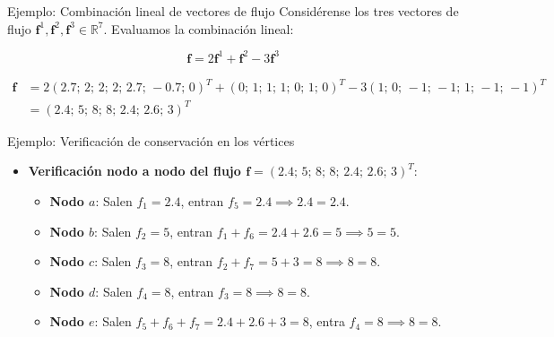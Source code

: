 \documentclass[
  ignorenonframetext,
]{beamer}
\providecommand{\tightlist}{%
  \setlength{\itemsep}{0pt}\setlength{\parskip}{0pt}}
\begin{document}
\begin{frame}{Ejemplo: Combinación lineal de vectores de flujo}
\label{ejemplo-combinaciuxf3n-lineal-de-vectores-de-flujo}
Considérense los tres vectores de flujo
\(\mathbf{f}^1, \mathbf{f}^2, \mathbf{f}^3 \in \mathbb{R}^7\). Evaluamos
la combinación lineal:

\[\mathbf{f} = 2\mathbf{f}^1 + \mathbf{f}^2 - 3\mathbf{f}^3\]

\[
\begin{aligned}
\mathbf{f} &= 2(2.7;\, 2;\, 2;\, 2;\, 2.7;\, -0.7;\, 0)^T + (0;\, 1;\, 1;\, 1;\, 0;\, 1;\, 0)^T - 3(1;\, 0;\, -1;\, -1;\, 1;\, -1;\, -1)^T \\
&= (2.4;\, 5;\, 8;\, 8;\, 2.4;\, 2.6;\, 3)^T
\end{aligned}
\]
\end{frame}

\begin{frame}{Ejemplo: Verificación de conservación en los vértices}
\label{ejemplo-verificaciuxf3n-de-conservaciuxf3n-en-los-vuxe9rtices}
\begin{itemize}
\tightlist
\item
  \textbf{Verificación nodo a nodo del flujo
  \(\mathbf{f} = (2.4;\, 5;\, 8;\, 8;\, 2.4;\, 2.6;\, 3)^T\)}:

  \begin{itemize}
  \tightlist
  \item
    \textbf{Nodo \(a\)}: Salen \(f_1 = 2.4\), entran
    \(f_5 = 2.4 \implies 2.4 = 2.4\).
  \item
    \textbf{Nodo \(b\)}: Salen \(f_2 = 5\), entran
    \(f_1 + f_6 = 2.4 + 2.6 = 5 \implies 5 = 5\).
  \item
    \textbf{Nodo \(c\)}: Salen \(f_3 = 8\), entran
    \(f_2 + f_7 = 5 + 3 = 8 \implies 8 = 8\).
  \item
    \textbf{Nodo \(d\)}: Salen \(f_4 = 8\), entran
    \(f_3 = 8 \implies 8 = 8\).
  \item
    \textbf{Nodo \(e\)}: Salen \(f_5 + f_6 + f_7 = 2.4 + 2.6 + 3 = 8\),
    entra \(f_4 = 8 \implies 8 = 8\).
  \end{itemize}
\end{itemize}
\end{frame}
\end{document}
